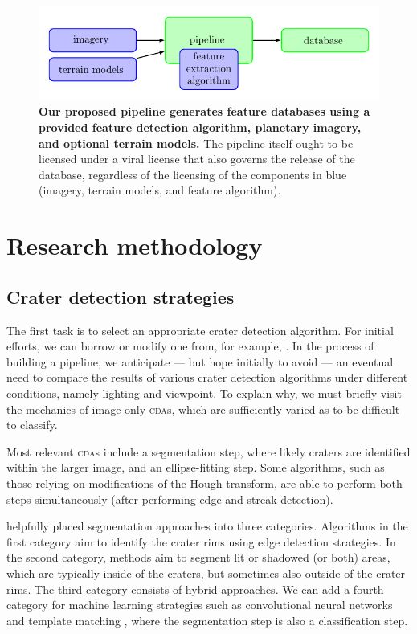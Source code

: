 \documentclass[12pt]{article}
\begin{document}
\begin{figure}
\center\includegraphics{flowchart.pdf}
\caption{\label{fig:flowchart}\textbf{Our proposed pipeline generates feature databases using a provided feature detection algorithm, planetary imagery, and optional terrain models.} The pipeline itself ought to be licensed under a viral license that also governs the release of the database, regardless of the licensing of the components in blue (imagery, terrain models, and feature algorithm).}
\end{figure}

\section{Research methodology}
\subsection{Crater detection strategies}
The first task is to select an appropriate crater detection algorithm. For initial efforts, we can borrow or modify one from, for example, \citet{Woicke2018}. In the process of building a pipeline, we anticipate --- but hope initially to avoid --- an eventual need to compare the results of various crater detection algorithms under different conditions, namely lighting and viewpoint. To explain why, we must briefly visit the mechanics of image-only \textsc{cda}s, which are sufficiently varied as to be difficult to classify.

Most relevant \textsc{cda}s include a segmentation step, where likely craters are identified within the larger image, and an ellipse-fitting step. Some algorithms, such as those relying on modifications of the Hough transform, are able to perform both steps simultaneously (after performing edge and streak detection).

\citet{Maass2016} helpfully placed segmentation approaches into three categories. Algorithms in the first category aim to identify the crater rims using edge detection strategies. In the second category, methods aim to segment lit or shadowed (or both) areas, which are typically inside of the craters, but sometimes also outside of the crater rims. The third category consists of hybrid approaches. We can add a fourth category for machine learning strategies such as convolutional neural networks \citep{DeLatte2019} and template matching \citet{Bandeira2007}, where the segmentation step is also a classification step. %
\end{document}
